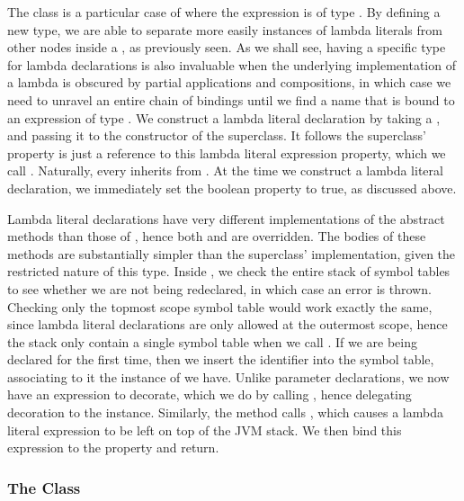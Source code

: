 The  class is a particular case of  where the expression is of type . By defining a new type, we are able to separate more easily instances of lambda literals from other nodes inside a , as previously seen. As we shall see, having a specific type for lambda declarations is also invaluable when the underlying implementation of a lambda is obscured by partial applications and compositions, in which case we need to unravel an entire chain of bindings until we find a name that is bound to an expression of type . We construct a lambda literal declaration by taking a , and passing it to the constructor of the superclass. It follows the superclass'  property is just a reference to this lambda literal expression property, which we call . Naturally, every  inherits from . At the time we construct a lambda literal declaration, we immediately set the  boolean property to true, as discussed above.

Lambda literal declarations have very different implementations of the  abstract methods than those of , hence both  and  are overridden. The bodies of these methods are substantially simpler than the superclass' implementation, given the restricted nature of this type. Inside , we check the entire stack of symbol tables to see whether we are not being redeclared, in which case an error is thrown. Checking only the topmost scope symbol table would work exactly the same, since lambda literal declarations are only allowed at the outermost scope, hence the stack only contain a single symbol table when we call . If we are being declared for the first time, then we insert the identifier into the symbol table, associating to it the instance of  we have. Unlike parameter declarations, we now have an expression to decorate, which we do by calling , hence delegating decoration to the  instance. Similarly, the  method calls , which causes a lambda literal expression to be left on top of the JVM stack. We then bind this expression to the  property and return.

\subsubsection{The  Class}

